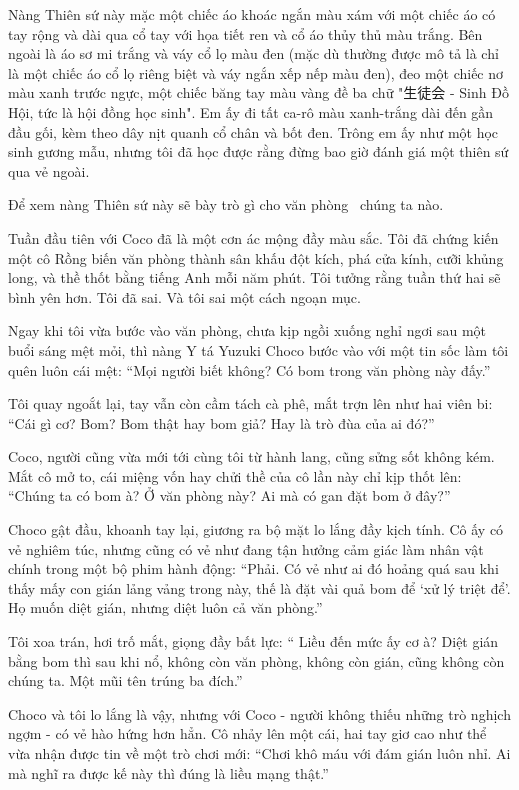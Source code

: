 \documentclass[../main.tex]{subfiles}
\begin{document}
Nàng Thiên sứ này mặc một chiếc áo khoác ngắn màu xám với một chiếc áo có tay rộng và dài qua cổ tay với họa tiết ren và cổ áo thủy thủ màu trắng. Bên ngoài là áo sơ mi trắng và váy cổ lọ màu đen (mặc dù thường được mô tả là chỉ là một chiếc áo cổ lọ riêng biệt và váy ngắn xếp nếp màu đen), đeo một chiếc nơ màu xanh trước ngực, một chiếc băng tay màu vàng đề ba chữ "生徒会 - Sinh Đồ Hội, tức là hội đồng học sinh". Em ấy đi tất ca-rô màu xanh-trắng dài đến gần đầu gối, kèm theo dây nịt quanh cổ chân và bốt đen. Trông em ấy như một học sinh gương mẫu, nhưng tôi đã học được rằng đừng bao giờ đánh giá một thiên sứ qua vẻ ngoài.

\chrint

Để xem nàng Thiên sứ này sẽ bày trò gì cho văn phòng \hll\ chúng ta nào.

\il

Tuần đầu tiên với Coco đã là một cơn ác mộng đầy màu sắc. Tôi đã chứng kiến một cô Rồng biến văn phòng thành sân khấu đột kích, phá cửa kính, cưỡi khủng long, và thề thốt bằng tiếng Anh mỗi năm phút. Tôi tưởng rằng tuần thứ hai sẽ bình yên hơn. Tôi đã sai. Và tôi sai một cách ngoạn mục.

Ngay khi tôi vừa bước vào văn phòng, chưa kịp ngồi xuống nghỉ ngơi sau một buổi sáng mệt mỏi, thì nàng Y tá Yuzuki Choco bước vào với một tin sốc làm tôi quên luôn cái mệt: ``Mọi người biết không? Có bom trong văn phòng này đấy.''

Tôi quay ngoắt lại, tay vẫn còn cầm tách cà phê, mắt trợn lên như hai viên bi: ``Cái gì cơ? Bom? Bom thật hay bom giả? Hay là trò đùa của ai đó?''

Coco, người cũng vừa mới tới cùng tôi từ hành lang, cũng sửng sốt không kém. Mắt cô mở to, cái miệng vốn hay chửi thề của cô lần này chỉ kịp thốt lên: ``Chúng ta có bom à? Ở văn phòng này? Ai mà có gan đặt bom ở đây?''

Choco gật đầu, khoanh tay lại, giương ra bộ mặt lo lắng đầy kịch tính. Cô ấy có vẻ nghiêm túc, nhưng cũng có vẻ như đang tận hưởng cảm giác làm nhân vật chính trong một bộ phim hành động: ``Phải. Có vẻ như ai đó hoảng quá sau khi thấy mấy con gián lảng vảng trong này, thế là đặt vài quả bom để `xử lý triệt để'. Họ muốn diệt gián, nhưng diệt luôn cả văn phòng.''

Tôi xoa trán, hơi trố mắt, giọng đầy bất lực: `` Liều đến mức ấy cơ à? Diệt gián bằng bom thì sau khi nổ, không còn văn phòng, không còn gián, cũng không còn chúng ta. Một mũi tên trúng ba đích.''

Choco và tôi lo lắng là vậy, nhưng với Coco - người không thiếu những trò nghịch ngợm - có vẻ hào hứng hơn hẳn. Cô nhảy lên một cái, hai tay giơ cao như thể vừa nhận được tin về một trò chơi mới: ``Chơi khô máu với đám gián luôn nhỉ. Ai mà nghĩ ra được kế này thì đúng là liều mạng thật.''
\end{document}
